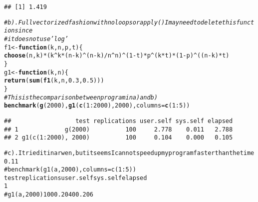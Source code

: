 \documentclass{article}\usepackage[]{graphicx}\usepackage[]{color}
\makeatletter
\newcommand{\hlnum}[1]{\textcolor[rgb]{0.686,0.059,0.569}{#1}}%
\newcommand{\hlcom}[1]{\textcolor[rgb]{0.678,0.584,0.686}{\textit{#1}}}%
\newcommand{\hlopt}[1]{\textcolor[rgb]{0,0,0}{#1}}%
\newcommand{\hlstd}[1]{\textcolor[rgb]{0.345,0.345,0.345}{#1}}%
\newcommand{\hlkwa}[1]{\textcolor[rgb]{0.161,0.373,0.58}{\textbf{#1}}}%
\newcommand{\hlkwb}[1]{\textcolor[rgb]{0.69,0.353,0.396}{#1}}%
\newcommand{\hlkwc}[1]{\textcolor[rgb]{0.333,0.667,0.333}{#1}}%
\newcommand{\hlkwd}[1]{\textcolor[rgb]{0.737,0.353,0.396}{\textbf{#1}}}%
\newenvironment{kframe}{%
 \def\at@end@of@kframe{}%
 \ifinner\ifhmode%
  \def\at@end@of@kframe{\end{minipage}}%
  \begin{minipage}{\columnwidth}%
 \fi\fi%
 \def\FrameCommand##1{\hskip\@totalleftmargin \hskip-\fboxsep
 \colorbox{shadecolor}{##1}\hskip-\fboxsep
     \hskip-\linewidth \hskip-\@totalleftmargin \hskip\columnwidth}%
 \MakeFramed {\advance\hsize-\width
   \@totalleftmargin\z@ \linewidth\hsize
   \@setminipage}}%
 {\par\unskip\endMakeFramed%
 \at@end@of@kframe}
\newenvironment{knitrout}{}{} %
\makeatother
\begin{document}
\begin{knitrout}
\begin{kframe}
\begin{verbatim}
## [1] 1.419
\end{verbatim}
\begin{alltt}
\hlcom{# b).  Full vectorized fashion with no loops or apply() I may need to delete this function since}
\hlcom{# it does not use 'log'}
\hlstd{f1} \hlkwb{<-} \hlkwa{function}\hlstd{(}\hlkwc{k}\hlstd{,} \hlkwc{n}\hlstd{,} \hlkwc{p}\hlstd{,} \hlkwc{t}\hlstd{) \{}
    \hlkwd{choose}\hlstd{(n, k)} \hlopt{*} \hlstd{(k}\hlopt{^}\hlstd{k} \hlopt{*} \hlstd{(n} \hlopt{-} \hlstd{k)}\hlopt{^}\hlstd{(n} \hlopt{-} \hlstd{k)}\hlopt{/}\hlstd{n}\hlopt{^}\hlstd{n)}\hlopt{^}\hlstd{(}\hlnum{1} \hlopt{-} \hlstd{t)} \hlopt{*} \hlstd{p}\hlopt{^}\hlstd{(k} \hlopt{*} \hlstd{t)} \hlopt{*} \hlstd{(}\hlnum{1} \hlopt{-} \hlstd{p)}\hlopt{^}\hlstd{((n} \hlopt{-} \hlstd{k)} \hlopt{*} \hlstd{t)}
\hlstd{\}}
\hlstd{g1} \hlkwb{<-} \hlkwa{function}\hlstd{(}\hlkwc{k}\hlstd{,} \hlkwc{n}\hlstd{) \{}
    \hlkwd{return}\hlstd{(}\hlkwd{sum}\hlstd{(}\hlkwd{f1}\hlstd{(k, n,} \hlnum{0.3}\hlstd{,} \hlnum{0.5}\hlstd{)))}
\hlstd{\}}
\hlcom{# This is the comparison between program in a) and b)}
\hlkwd{benchmark}\hlstd{(}\hlkwd{g}\hlstd{(}\hlnum{2000}\hlstd{),} \hlkwd{g1}\hlstd{(}\hlkwd{c}\hlstd{(}\hlnum{1}\hlopt{:}\hlnum{2000}\hlstd{),} \hlnum{2000}\hlstd{),} \hlkwc{columns} \hlstd{=} \hlkwd{c}\hlstd{(}\hlnum{1}\hlopt{:}\hlnum{5}\hlstd{))}
\end{alltt}
\begin{verbatim}
##                  test replications user.self sys.self elapsed
## 1             g(2000)          100     2.778    0.011   2.788
## 2 g1(c(1:2000), 2000)          100     0.104    0.000   0.105
\end{verbatim}
\begin{alltt}

# c). I tried it in arwen, but it seems I can not speed up my program faster than the time 0.11
# benchmark(g1(a,2000),columns = c(1:5))\\ test replications user.self sys.self elapsed\\ 1
# g1(a, 2000) 100 0.204 0 0.206\\
\end{alltt}
\end{kframe}
\end{knitrout}
\end{document}
